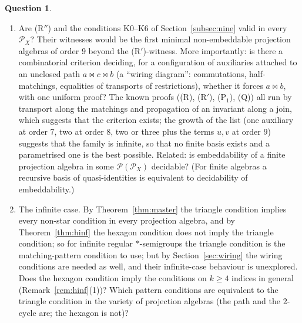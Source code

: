 \documentclass[11pt]{amsart}
\theoremstyle{definition}
\newtheorem{question}[theorem]{Question}
\renewcommand{\P}{\mathcal{P}}
\begin{document}
\begin{question}
\begin{enumerate}[label=\textup{(\arabic*)}]
\item Are (R$''$) and the conditions K0--K6 of Section~\ref{subsec:nine} valid in every $\P_X$? Their witnesses would be the first minimal non-embeddable projection algebras of order $9$ beyond the (R$'$)-witness. More importantly: is there a combinatorial criterion deciding, for a configuration of auxiliaries attached to an unclosed path $a\bowtie c\bowtie b$ (a ``wiring diagram'': commutations, half-matchings, equalities of transports of restrictions), whether it forces $a\bowtie b$, with one uniform proof? The known proofs ((R), (R$'$), (P$_1$), (Q)) all run by transport along the matchings and propagation of an invariant along a join, which suggests that the criterion exists; the growth of the list (one auxiliary at order $7$, two at order $8$, two or three plus the terms $u,v$ at order $9$) suggests that the family is infinite, so that no finite basis exists and a parametrised one is the best possible. Related: is embeddability of a finite projection algebra in some $\P(\P_X)$ decidable? (For finite algebras a recursive basis of quasi-identities is equivalent to decidability of embeddability.)
\item The infinite case. By Theorem~\ref{thm:master} the triangle condition implies every non-star condition in every projection algebra, and by Theorem~\ref{thm:hinf} the hexagon condition does not imply the triangle condition; so for infinite regular $*$-semigroups the triangle condition is the matching-pattern condition to use; but by Section~\ref{sec:wiring} the wiring conditions are needed as well, and their infinite-case behaviour is unexplored. Does the hexagon condition imply the conditions on $k\ge4$ indices in general (Remark~\ref{rem:hinf}(1))? Which pattern conditions are equivalent to the triangle condition in the variety of projection algebras (the path and the $2$-cycle are; the hexagon is not)?
\end{enumerate}
\end{question}
\end{document}
